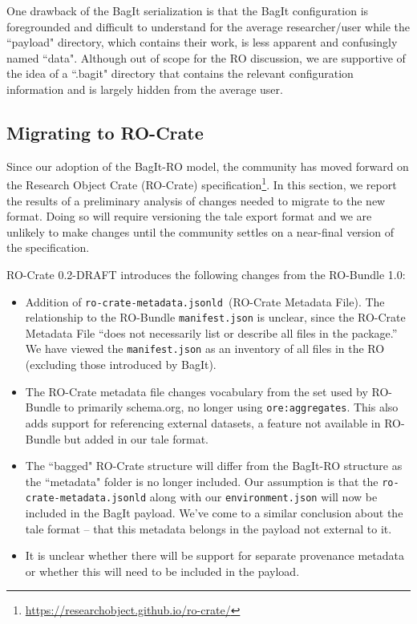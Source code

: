 \documentclass[conference]{IEEEtran}
\begin{document}
One drawback of the BagIt serialization is that the BagIt configuration is foregrounded and 
difficult to understand for the average researcher/user while the ``payload" directory, which contains
their work, is less apparent and confusingly named ``data". Although out of scope for the RO discussion, we are 
supportive of the idea of a ``.bagit" directory that contains the relevant configuration 
information and is largely hidden from the average user.


\subsection{Migrating to RO-Crate}
Since our adoption of the BagIt-RO model, the community has moved forward on the Research Object 
Crate (RO-Crate) specification\footnote{\url{https://researchobject.github.io/ro-crate/}}. In this section, we report the results of a preliminary analysis 
of changes needed to migrate to the new format. Doing so will require versioning the tale export 
format and we are unlikely to make changes until the community settles on a near-final version of the 
specification.

RO-Crate 0.2-DRAFT introduces the following changes from the RO-Bundle 1.0:
\begin{itemize}
\item{Addition of \texttt{ro-crate-metadata.jsonld }(RO-Crate Metadata File). The relationship to the RO-Bundle \texttt{manifest.json} is unclear, since the RO-Crate Metadata File ``does not necessarily list or describe all files in the package.'' We have viewed the \texttt{manifest.json} as an inventory of all files in the RO (excluding those introduced by BagIt).}
\item{The RO-Crate metadata file changes vocabulary from the set used by RO-Bundle to primarily schema.org, no longer using \texttt{ore:aggregates}. This also adds support for referencing external datasets, a feature not available in RO-Bundle but added in our tale format.}
\item{The ``bagged" RO-Crate structure will differ from the BagIt-RO structure as the ``metadata" folder is no longer included.  Our assumption is that the \texttt{ro-crate-metadata.jsonld} along with our \texttt{environment.json} will now be included in the BagIt payload. We've come to a similar conclusion about the tale format -- that this metadata belongs in the payload not external to it.}
\item{It is unclear whether there will be support for separate provenance metadata or whether this will need to be included in the payload.}
\end{itemize}
\end{document}
